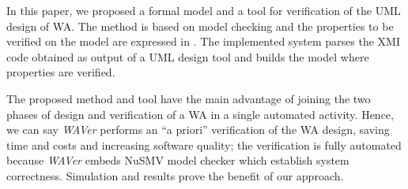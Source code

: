 In this paper, we proposed a formal model and a tool for verification of the UML design of WA. The method is based on model checking and the properties to be verified on the model are expressed in \ctl. The implemented system parses the XMI code obtained as output of a UML design tool and builds the \smv model where properties are verified.

The proposed method and tool have the main advantage of joining the two phases of design and verification of a WA in a single automated activity. Hence, we can say \textit{WAVer} performs an ``a priori'' verification of the WA design, saving time and costs and increasing software quality; the verification is fully automated because \textit{WAVer} embeds NuSMV model checker which establish system correctness. Simulation and results prove the benefit of our approach.